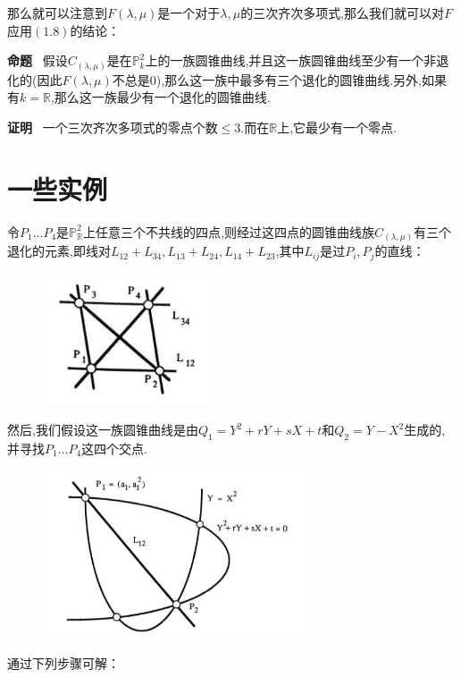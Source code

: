 \documentclass[UTF8]{book}
\begin{document}
		
		那么就可以注意到$F(\lambda, \mu)$是一个对于$\lambda, \mu$的三次齐次多项式,那么我们就可以对$F$应用$(1.8)$的结论：
		
	
		\textbf{命题} \ 假设$C_{(\lambda, \mu)}$是在$\mathbb{P}^{2}_{k}$上的一族圆锥曲线,并且这一族圆锥曲线至少有一个非退化的(因此$F(\lambda, \mu)$不总是0),那么这一族中最多有三个退化的圆锥曲线.另外,如果有$k=\mathbb{R}$,那么这一族最少有一个退化的圆锥曲线.
		
		
		\textbf{证明} \ 一个三次齐次多项式的零点个数$\leq 3$.而在$\mathbb{R}$上,它最少有一个零点.

	\section{一些实例}
		令$P_{1} \ldots P_{4}$是$\mathbb{P}^{2}_{\mathbb{R}}$上任意三个不共线的四点,则经过这四点的圆锥曲线族$C_{(\lambda, \mu)}$有三个退化的元素,即线对$L_{12}+L_{34}, L_{13}+L_{24}, L_{14}+L_{23}$,其中$L_{ij}$是过$P_{i},P_{j}$的直线：
		\begin{figure}[H]
		  \centering
		  \includegraphics[width=5cm]{22.jpg}
		\end{figure}
	
	
		{然后,我们假设这一族圆锥曲线是由$Q_{1}=Y^{2}+r Y+s X+t$和$Q_{2}=Y-X^{2}$生成的,并寻找$P_{1} \ldots P_{4}$这四个交点.}
		
		\begin{figure}[H]
		  \centering
		  \includegraphics[width=8cm]{23.jpg}
		\end{figure}
	
	
		通过下列步骤可解：
		
\end{document}
